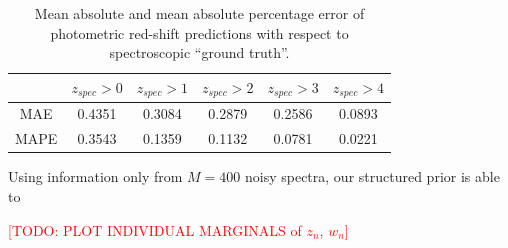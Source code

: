 \documentclass{article}
\newcommand{\red}[1]{\textcolor{red}{[TODO: #1]}}
\begin{document}
\begin{table}[t]
\caption{Mean absolute and mean absolute percentage error of photometric red-shift predictions with respect to spectroscopic ``ground truth''. }
\label{sample-table}
\vskip 0.15in
\begin{center}
\begin{small}
\begin{sc}
\begin{tabular}{cccccc}
\hline
\abovespace\belowspace
        &  $z_{spec} > 0$ & $z_{spec} > 1$ & $z_{spec} > 2$ & $z_{spec} > 3$ & $z_{spec} > 4$ \\
\hline
\abovespace
MAE  &  0.4351 & 0.3084 & 0.2879 & 0.2586 & 0.0893 \\
MAPE &  0.3543 & 0.1359 & 0.1132 & 0.0781 & 0.0221 \\
\hline
\end{tabular}
\end{sc}
\end{small}
\end{center}
\vskip -0.1in
\end{table}




Using information only from $M = 400$ noisy spectra, our structured prior is able to 



\red{PLOT INDIVIDUAL MARGINALS of $z_n$, $w_n$}
\end{document}
